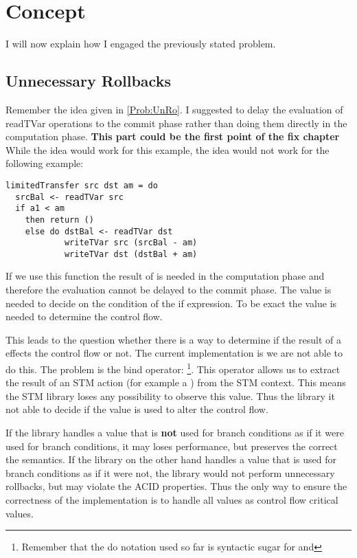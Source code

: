 
\chapter{Concept} %

\label{Chapter2} %

I will now explain how I engaged the previously stated problem.

\section{Unnecessary Rollbacks}
Remember the idea given in \ref{Prob:UnRo}. I suggested to delay the evaluation of 
readTVar operations to the commit phase rather than doing them directly in the computation
phase.
\textbf{This part could be the first point of the fix chapter}
While the idea would work for this example, the idea would not work 
for the following example:
\begin{lstlisting}
limitedTransfer src dst am = do 
  srcBal <- readTVar src
  if a1 < am
    then return ()
    else do dstBal <- readTVar dst
            writeTVar src (srcBal - am)
            writeTVar dst (dstBal + am)
\end{lstlisting}
If we use this function the result of  is needed in the computation phase and therefore 
the evaluation cannot be delayed to the commit phase. The value is needed to decide on the condition of the 
if expression. To be exact the value is needed to determine the control flow. 

This leads to the question whether there is a way to determine if the result of a  effects the 
control flow or not. The current implementation is we are not able to do this. The problem is the bind
operator: \footnote{Remember that the do notation used so far is 
syntactic sugar for \code{>>=} and \code{>>}}. This operator allows us to extract the result of an STM action 
(for example a ) from the STM context. This means the STM library loses any possibility to 
observe this value. Thus the library it not able to decide if the value is used to alter the control flow.

If the library handles a value that is \textbf{not} used for branch conditions as if it were used for branch conditions, 
it may loses performance, but preserves the correct the semantics. If the library on the other hand handles a value that is
used for branch conditions as if it were not, the library would not perform unnecessary rollbacks, but may violate 
the ACID properties. Thus the only way to ensure the correctness of the implementation is to handle all 
values as control flow critical values. 

